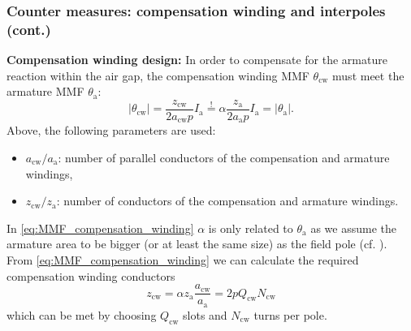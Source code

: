 \begin{frame}
	\frametitle{Counter measures: compensation winding and interpoles (cont.)}
   \textbf{Compensation winding design:}
   In order to compensate for the armature reaction within the air gap, the compensation winding MMF $\theta_\mathrm{cw}$ must meet the armature MMF $\theta_\mathrm{a}$:
   \begin{equation}
	   |\theta_\mathrm{cw}| = \frac{z_\mathrm{cw}}{2 a_\mathrm{cw} p }  I_\mathrm{a} \stackrel{!}{=} \alpha \frac{z_\mathrm{a}}{2 a_\mathrm{a} p } I_\mathrm{a} =|\theta_\mathrm{a}|.
	   \label{eq:MMF_compensation_winding}
	\end{equation}
	Above, the following parameters are used:
	\begin{itemize}
		\item $a_\mathrm{cw} / a_\mathrm{a}$: number of parallel conductors of the compensation and armature windings,
		\item $z_\mathrm{cw} / z_\mathrm{a}$: number of conductors of the compensation  and armature windings.
	\end{itemize} \pause
	In \eqref{eq:MMF_compensation_winding} $\alpha$ is only related to $\theta_\mathrm{a}$ as we assume the armature area to be bigger (or at least the same size) as the field pole (cf. ). \pause From \eqref{eq:MMF_compensation_winding} we can calculate the required compensation winding conductors
	\begin{equation}
		z_\mathrm{cw} = \alpha z_\mathrm{a} \frac{a_\mathrm{cw}}{a_\mathrm{a}} =  2p Q_\mathrm{cw} N_\mathrm{cw}
	\end{equation}
	which can be met by choosing $Q_\mathrm{cw}$ slots and $N_\mathrm{cw}$ turns per pole.
\end{frame}

